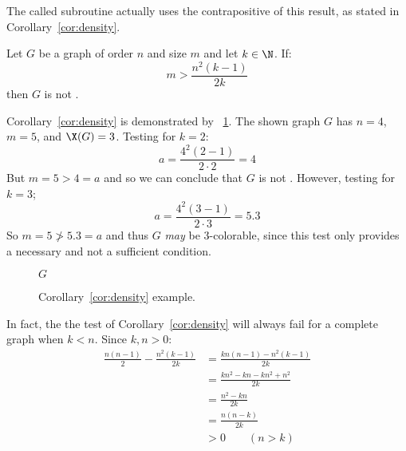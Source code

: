 The called subroutine actually uses the contrapositive of this result, as stated in Corollary~\ref{cor:density}.

\begin{corollary}
  \label{cor:density}
  Let \(G\) be a graph of order \(n\) and size \(m\) and let \(k\in\N\).  If:
  \[m>\frac{n^2(k-1)}{2k}\]
  then \(G\) is not .
\end{corollary}

Corollary~\ref{cor:density} is demonstrated by \figurename~\ref{fig:density}.  The shown graph \(G\) has \(n=4\),
\(m=5\), and \(\X(G)=3\).  Testing for \(k=2\):
\[a=\frac{4^2(2-1)}{2\cdot2}=4\]
But \(m=5>4=a\) and so we can conclude that \(G\) is not .  However, testing for \(k=3\);
\[a=\frac{4^2(3-1)}{2\cdot3}=5.3\]
So \(m=5\ngtr5.3=a\) and thus \(G\) \emph{may} be \(3\)-colorable, since this test only provides a necessary and
not a sufficient condition.

\begin{figure}[H]
  \centering

  \(G\)
  \caption{Corollary~\ref{cor:density} example.}
  \label{fig:density}
\end{figure}

In fact, the the test of Corollary~\ref{cor:density} will always fail for a complete graph when \(k<n\).  Since
\(k,n>0\):
\begin{align*}
  \frac{n(n-1)}{2}-\frac{n^2(k-1)}{2k} &= \frac{kn(n-1)-n^2(k-1)}{2k} \\
  &= \frac{kn^2-kn-kn^2+n^2}{2k} \\
  &= \frac{n^2-kn}{2k} \\
  &= \frac{n(n-k)}{2k} \\
  &>0\qquad(n>k)
\end{align*}

